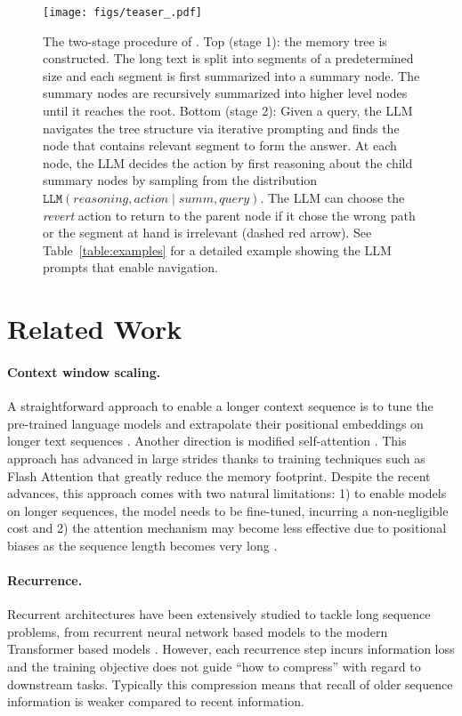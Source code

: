 \begin{figure}[t]
    \centering
    \texttt{[image: figs/teaser\_.pdf]}
    \caption{
        The two-stage procedure of \sysname{}. Top (stage 1): the memory tree is constructed. The long text is split into segments of a predetermined size and  each segment is first summarized into a summary node. The summary nodes are recursively summarized into higher level nodes until it reaches the root.
        Bottom (stage 2): Given a query, the LLM navigates the tree structure via iterative prompting and finds the node that contains relevant segment to form the answer. At each node, the LLM decides the action by first reasoning about the child summary nodes by sampling from the distribution $\texttt{LLM}(reasoning, action \mid summ, query)$.
        The LLM can choose the {\em revert} action to return to the parent node if it chose the wrong path or the segment at hand is irrelevant (dashed red arrow). See Table~\ref{table:examples} for a detailed example showing the LLM prompts that enable navigation.
    }
    \label{fig:teaser}
\end{figure}\section{Related Work}\label{sec:related}

\paragraph{Context window scaling.}
A straightforward approach to enable a longer context sequence is to tune the pre-trained language models and extrapolate their positional embeddings on longer text sequences \citep{press2022train, chen2023extending}.
Another direction is modified self-attention \citep{beltagy2020longformer, zaheer2020bigbird, guo2022longt5, ainslie2023colt5}.
This approach has advanced in large strides thanks to training techniques such as Flash Attention \citep{dao2022flash} that greatly reduce the memory footprint.
Despite the recent advances, this approach comes with two natural limitations: 1) to enable models on longer sequences, the model needs to be fine-tuned, incurring a non-negligible cost and 2) the attention mechanism may become less effective due to positional biases as the sequence length becomes very long \citep{liu2023lost}.

\paragraph{Recurrence.}
Recurrent architectures have been extensively studied to tackle long sequence problems, from  recurrent neural network based models \cite{hochreiter1997lstm, miller2016memorynetwork} to the modern Transformer based models \citep{dai2019transformerxl, rae2019compressive, fan2020feedback, xu2022beyond, bulatov2023rmt, chevalier2023adapting}. However, each recurrence step incurs information loss and the training objective does not guide ``how to compress'' with regard to downstream tasks. Typically this compression means that recall of older sequence information is weaker compared to recent information.

